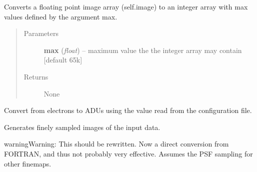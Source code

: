 \documentclass[a4paper,12pt,english]{sphinxmanual}
\begin{document}
\begin{fulllineitems}
\begin{fulllineitems}
\end{fulllineitems}


\begin{fulllineitems}
\label{simulator:simulator.simulator.VISsimulator.discretise}
Converts a floating point image array (self.image) to an integer array with max values
defined by the argument max.
\begin{quote}\begin{description}
\item[{Parameters}] \leavevmode
\textbf{max} (\emph{float}) -- maximum value the the integer array may contain {[}default 65k{]}

\item[{Returns}] \leavevmode
None

\end{description}\end{quote}

\end{fulllineitems}


\begin{fulllineitems}
\label{simulator:simulator.simulator.VISsimulator.electrons2ADU}
Convert from electrons to ADUs using the value read from the configuration file.

\end{fulllineitems}


\begin{fulllineitems}
\label{simulator:simulator.simulator.VISsimulator.generateFinemaps}
Generates finely sampled images of the input data.

\begin{notice}{warning}{Warning:}
This should be rewritten. Now a direct conversion from FORTRAN, and thus
not probably very effective. Assumes the PSF sampling for other finemaps.
\end{notice}

\end{fulllineitems}



\end{fulllineitems}
\end{document}
